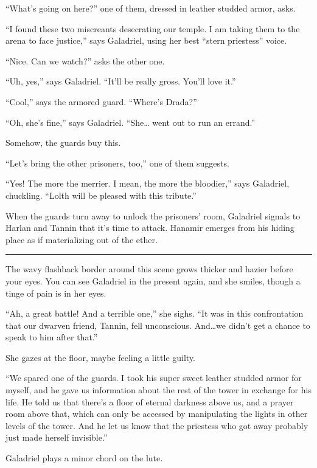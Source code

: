 \documentclass[smalldemyvopaper,11pt,twoside,onecolumn,openright,extrafontsizes]{memoir}
\begin{document}
``What's going on here?'' one of them, dressed in leather studded armor,
asks.

``I found these two miscreants desecrating our temple. I am taking them
to the arena to face justice,'' says Galadriel, using her best ``stern
priestess'' voice.

``Nice. Can we watch?'' asks the other one.

``Uh, yes,'' says Galadriel. ``It'll be really gross. You'll love it.''

``Cool,'' says the armored guard. ``Where's Drada?''

``Oh, she's fine,'' says Galadriel. ``She\ldots{} went out to run an
errand.''

Somehow, the guards buy this.

``Let's bring the other prisoners, too,'' one of them suggests.

``Yes! The more the merrier. I mean, the more the bloodier,'' says
Galadriel, chuckling. ``Lolth will be pleased with this tribute.''

When the guards turn away to unlock the prisoners' room, Galadriel
signals to Harlan and Tannin that it's time to attack. Hanamir emerges
from his hiding place as if materializing out of the ether.

\begin{center}\rule{0.5\linewidth}{\linethickness}\end{center}

The wavy flashback border around this scene grows thicker and hazier
before your eyes. You can see Galadriel in the present again, and she
smiles, though a tinge of pain is in her eyes.

``Ah, a great battle! And a terrible one,'' she sighs. ``It was in this
confrontation that our dwarven friend, Tannin, fell unconscious.
And\ldots we didn't get a chance to speak to him after that.''

She gazes at the floor, maybe feeling a little guilty.

``We spared one of the guards. I took his super sweet leather studded
armor for myself, and he gave us information about the rest of the tower
in exchange for his life. He told us that there's a floor of eternal
darkness above us, and a prayer room above that, which can only be
accessed by manipulating the lights in other levels of the tower. And he
let us know that the priestess who got away probably just made herself
invisible.''

Galadriel plays a minor chord on the lute.
\end{document}
